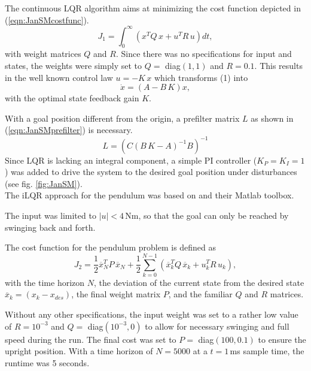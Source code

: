 \documentclass[letterpaper, 10 pt, conference]{ieeeconf}  %
\begin{document}
The continuous LQR algorithm aims at minimizing the cost function depicted in (\ref{eqn:JanSMcostfunc}).
\begin{equation}\label{eqn:JanSMcostfunc}
	J_1 = \int^{\infty}_{0} \left(x^{T}Q\,x + u^{T}R\,u\right)dt,
\end{equation}
with weight matrices $Q$ and $R$.
Since there was no specifications for input and states, the weights were simply set to $Q=$ diag$(1,1)$ and $R=0.1$. 
This results in the well known control law $u=-K\,x$ which transforms (1) into
\begin{equation}\label{eqn:JanSMcontrolledSys}
	\dot{x} = (A-B\,K)x,
\end{equation}
with the optimal state feedback gain $K$.

With a goal position different from the origin, a prefilter matrix $L$ as shown in (\ref{eqn:JanSMprefilter}) is necessary.
\begin{equation}\label{eqn:JanSMprefilter}
L = \left(C(B\,K-A)^{-1}B\right)^{-1}
\end{equation}
Since LQR is lacking an integral component, a simple PI controller ($K_P=K_I=1$) was added to drive the system to the desired goal position under disturbances (see fig. \ref{fig:JanSM}). %
\\

The iLQR approach for the pendulum was based on \cite{Opti_iLQR} and their Matlab toolbox. 


The input was limited to $|u|<4$\,Nm, so that the goal can only be reached by swinging back and forth. 

The cost function for the pendulum problem is defined as 
\begin{equation}\label{eqn:JanPcostfunc}
J_2 = \frac{1}{2}\overline{x}_N^{T}P\,\overline{x}_N + \frac{1}{2}\sum_{k=0}^{N-1}\left(\overline{x}_k^{T}Q\,\overline{x}_k + u_k^{T}R\,u_k\right),
\end{equation}
with the time horizon $N$, the deviation of the current state from the desired state $\overline{x}_k=(x_k-x_{des})$, the final weight matrix $P$, and the familiar $Q$ and $R$ matrices. 

Without any other specifications, the input weight was set to a rather low value of $R=10^{-3}$ and $Q=$ diag$(10^{-3},0)$ to allow for necessary swinging and full speed during the run. The final cost was set to $P=$ diag$(100,0.1)$ to ensure the upright position. With a time horizon of $N=5000$ at a $t=1$\,ms sample time, the runtime was 5 seconds.
\end{document}
